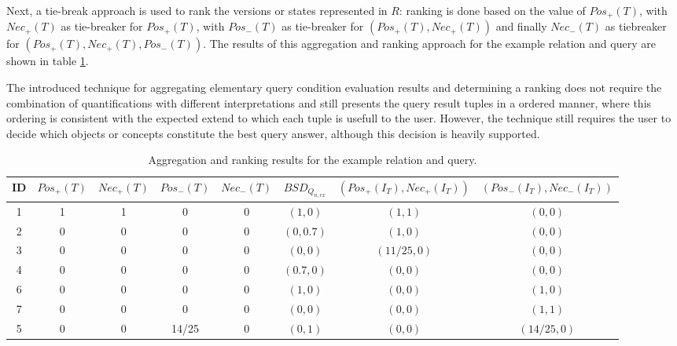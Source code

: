 \documentclass[runningheads,a4paper]{llncs}
\begin{document}
Next, a tie-break approach is used to rank the versions or states represented in $R$: ranking is done based on the value of $Pos_{+}(T)$, with $Nec_{+}(T)$ as tie-breaker for $Pos_{+}(T)$, with $Pos_{-}(T)$ as tie-breaker for $(Pos_{+}(T), Nec_{+}(T))$ and finally $Nec_{-}(T)$ as tiebreaker for $(Pos_{+}(T), Nec_{+}(T), Pos_{-}(T))$. The results of this aggregation and ranking approach for the example relation and query are shown in table \ref{tab:ex-ranking}.

The introduced technique for aggregating elementary query condition evaluation results and determining a ranking does not require the combination of quantifications with different interpretations and still presents the query result tuples in a ordered manner, where this ordering is consistent with the expected extend to which each tuple is usefull to the user. However, the technique still requires the user to decide which objects or concepts constitute the best query answer, although this decision is heavily supported.

\vspace{-10pt}
\begin{table}[ht]
\caption{Aggregation and ranking results for the example relation and query.}
\centering
\begin{tabular}{|c|c|c|c|c||c|c|c|}
\hline
\textbf{ID} & \textbf{$Pos_{+}(T)$} & \textbf{$Nec_{+}(T)$} & \textbf{$Pos_{-}(T)$} & \textbf{$Nec_{-}(T)$} & \textbf{$BSD_{Q_{n,ex}}$} & \textbf{$(Pos_{+}(I_T), Nec_{+}(I_T))$} & \textbf{$(Pos_{-}(I_T), Nec_{-}(I_T))$} \\
\hline
\hline
1 & 1 & 1 & 0 & 0 & $(1, 0)$ & $(1,1)$ & $(0,0)$ \\
\hline
2 & 0 & 0 & 0 & 0 & $(0, 0.7)$ & $(1,0)$ & $(0,0)$ \\
\hline
3 & 0 & 0 & 0 & 0 & $(0, 0)$ & $(11/25,0)$ & $(0,0)$ \\
\hline
4 & 0 & 0 & 0 & 0 & $(0.7, 0)$ & $(0,0)$ & $(0,0)$ \\
\hline
6 & 0 & 0 & 0 & 0 & $(1, 0)$ & $(0,0)$ & $(1,0)$ \\
\hline
7 & 0 & 0 & 0 & 0 & $(0, 0)$ & $(0,0)$ & $(1,1)$ \\
\hline
5 & 0 & 0 & 14/25 & 0 & $(0, 1)$ & $(0,0)$ & $(14/25,0)$ \\
\hline
\end{tabular}
\label{tab:ex-ranking}
\end{table}
\vspace{-15pt}
\end{document}

